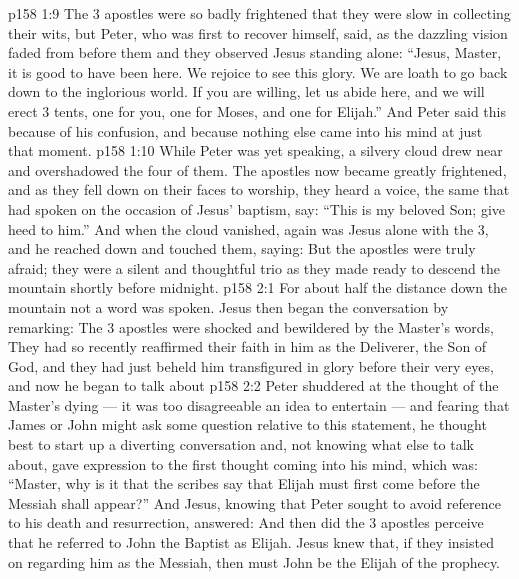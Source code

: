 \vs p158 1:9 The 3 apostles were so badly frightened that they were slow in collecting their wits, but Peter, who was first to recover himself, said, as the dazzling vision faded from before them and they observed Jesus standing alone: “Jesus, Master, it is good to have been here. We rejoice to see this glory. We are loath to go back down to the inglorious world. If you are willing, let us abide here, and we will erect 3 tents, one for you, one for Moses, and one for Elijah.” And Peter said this because of his confusion, and because nothing else came into his mind at just that moment.
\vs p158 1:10 While Peter was yet speaking, a silvery cloud drew near and overshadowed the four of them. The apostles now became greatly frightened, and as they fell down on their faces to worship, they heard a voice, the same that had spoken on the occasion of Jesus’ baptism, say: “This is my beloved Son; give heed to him.” And when the cloud vanished, again was Jesus alone with the 3, and he reached down and touched them, saying:  But the apostles were truly afraid; they were a silent and thoughtful trio as they made ready to descend the mountain shortly before midnight.
\vs p158 2:1 For about half the distance down the mountain not a word was spoken. Jesus then began the conversation by remarking:  The 3 apostles were shocked and bewildered by the Master’s words,  They had so recently reaffirmed their faith in him as the Deliverer, the Son of God, and they had just beheld him transfigured in glory before their very eyes, and now he began to talk about 
\vs p158 2:2 Peter shuddered at the thought of the Master’s dying --- it was too disagreeable an idea to entertain --- and fearing that James or John might ask some question relative to this statement, he thought best to start up a diverting conversation and, not knowing what else to talk about, gave expression to the first thought coming into his mind, which was: “Master, why is it that the scribes say that Elijah must first come before the Messiah shall appear?” And Jesus, knowing that Peter sought to avoid reference to his death and resurrection, answered:  And then did the 3 apostles perceive that he referred to John the Baptist as Elijah. Jesus knew that, if they insisted on regarding him as the Messiah, then must John be the Elijah of the prophecy.
